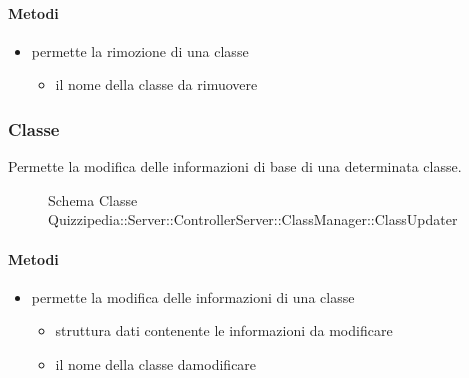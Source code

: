 \paragraph{Metodi}
\begin{itemize}
\item {}
\newline
permette la rimozione di una classe
\newline
{}
\newline
\begin{itemize}
\item {}
\newline
il nome della classe da rimuovere
\end{itemize}
\end{itemize}
\subsubsection{Classe }
Permette la modifica delle informazioni di base di una determinata classe.
\begin{figure}[H]
\centering
\noindent{}
\caption[Schema Classe ClassUpdater]{Schema Classe Quizzipedia::Server::ControllerServer::ClassManager::ClassUpdater}
\end{figure}
\paragraph{Metodi}
\begin{itemize}
\item {}
\newline
permette la modifica delle informazioni di una classe
\newline
{}
\newline
\begin{itemize}
\item {}
\newline
struttura dati contenente le informazioni da modificare
\item {}
\newline
il nome della classe damodificare
\end{itemize}
\end{itemize}
